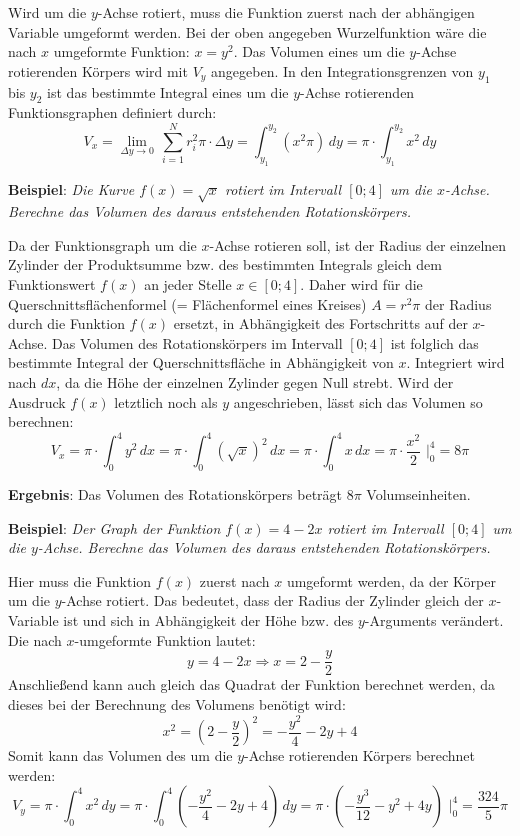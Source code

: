Wird um die $y$-Achse rotiert, muss die Funktion zuerst nach der abh\"{a}ngigen Variable umgeformt werden. Bei der oben angegeben Wurzelfunktion w\"{a}re die nach $x$ umgeformte Funktion: $x = y^2$. Das Volumen eines um die $y$-Achse rotierenden K\"{o}rpers wird mit $V_y$ angegeben. In den Integrationsgrenzen von $y_1$ bis $y_2$ ist das bestimmte Integral eines um die $y$-Achse rotierenden Funktionsgraphen definiert durch: $$V_x = \lim_{\Delta y \rightarrow 0} \, \sum_{i=1}^{N} r_i^2 \pi \cdot \Delta y = \int_{y_1}^{y_2} (x^2 \pi) \, dy = \pi \cdot \int_{y_1}^{y_2} x^2 \, dy$$ 

\pagebreak

\textbf{Beispiel}: \emph{Die Kurve $f(x) = \sqrt{x}$ rotiert im Intervall $[0;4]$ um die $x$-Achse. Berechne das Volumen des daraus entstehenden Rotationsk\"{o}rpers.}

Da der Funktionsgraph um die $x$-Achse rotieren soll, ist der Radius der einzelnen Zylinder der Produktsumme bzw. des bestimmten Integrals gleich dem Funktionswert $f(x)$ an jeder Stelle $x \in [0 ; 4]$. Daher wird f\"{u}r die Querschnittsfl\"{a}chenformel (= Fl\"{a}chenformel eines Kreises) $A = r^2 \pi$ der Radius durch die Funktion $f(x)$ ersetzt, in Abh\"{a}ngigkeit des Fortschritts auf der $x$-Achse. Das Volumen des Rotationsk\"{o}rpers im Intervall $[0 ; 4]$ ist folglich das bestimmte Integral der Querschnittsfl\"{a}che in Abh\"{a}ngigkeit von $x$. Integriert wird nach $dx$, da die H\"{o}he der einzelnen Zylinder gegen Null strebt. Wird der Ausdruck $f(x)$ letztlich noch als $y$ angeschrieben, l\"{a}sst sich das Volumen so berechnen: $$V_x = \pi \cdot \int_0^4 y^2 \, dx = \pi \cdot \int_0^4 (\sqrt{x})^2 \, dx = \pi \cdot \int_0^4 x \, dx = \pi \cdot \frac{x^2}{2} \, \, \bigg|_0^4 = 8\pi$$

\textbf{Ergebnis}: Das Volumen des Rotationsk\"{o}rpers betr\"{a}gt $8\pi$ Volumseinheiten. 

\textbf{Beispiel}: \emph{Der Graph der Funktion $f(x) = 4 - 2x$ rotiert im Intervall $[0 ; 4]$ um die $y$-Achse. Berechne das Volumen des daraus entstehenden Rotationsk\"{o}rpers.}

Hier muss die Funktion $f(x)$ zuerst nach $x$ umgeformt werden, da der K\"{o}rper um die $y$-Achse rotiert. Das bedeutet, dass der Radius der Zylinder gleich der $x$-Variable ist und sich in Abh\"{a}ngigkeit der H\"{o}he bzw. des $y$-Arguments ver\"{a}ndert. Die nach $x$-umgeformte Funktion lautet: $$y = 4 - 2x \Rightarrow x = 2 - \frac{y}{2}$$ Anschlie\ss{}end kann auch gleich das Quadrat der Funktion berechnet werden, da dieses bei der Berechnung des Volumens ben\"{o}tigt wird: $$x^2 = \left(2 - \frac{y}{2}\right)^2 = -\frac{y^2}{4} - 2y + 4$$ Somit kann das Volumen des um die $y$-Achse rotierenden K\"{o}rpers berechnet werden: $$V_y = \pi \cdot \int_0^4 x^2 \, dy = \pi \cdot \int_0^4 \left( -\frac{y^2}{4} - 2y + 4 \right) \, dy = \pi \cdot \left( -\frac{y^3}{12} - y^2 + 4y \right) \,\, \bigg |_0^4 = \frac{324}{5} \pi $$

